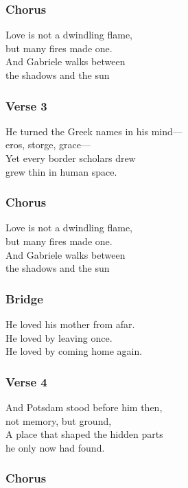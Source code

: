 \subsubsection{Chorus}\label{chorus}

Love is not a dwindling flame,\\
but many fires made one.\\
And Gabriele walks between\\
the shadows and the sun

\subsubsection{Verse 3}\label{verse-3}

He turned the Greek names in his mind---\\
eros, storge, grace---\\
Yet every border scholars drew\\
grew thin in human space.

\subsubsection{Chorus}\label{chorus-1}

Love is not a dwindling flame,\\
but many fires made one.\\
And Gabriele walks between\\
the shadows and the sun

\subsubsection{Bridge}\label{bridge}

He loved his mother from afar.\\
He loved by leaving once.\\
He loved by coming home again.

\subsubsection{Verse 4}\label{verse-4}

And Potsdam stood before him then,\\
not memory, but ground,\\
A place that shaped the hidden parts\\
he only now had found.

\subsubsection{Chorus}\label{chorus-2}

